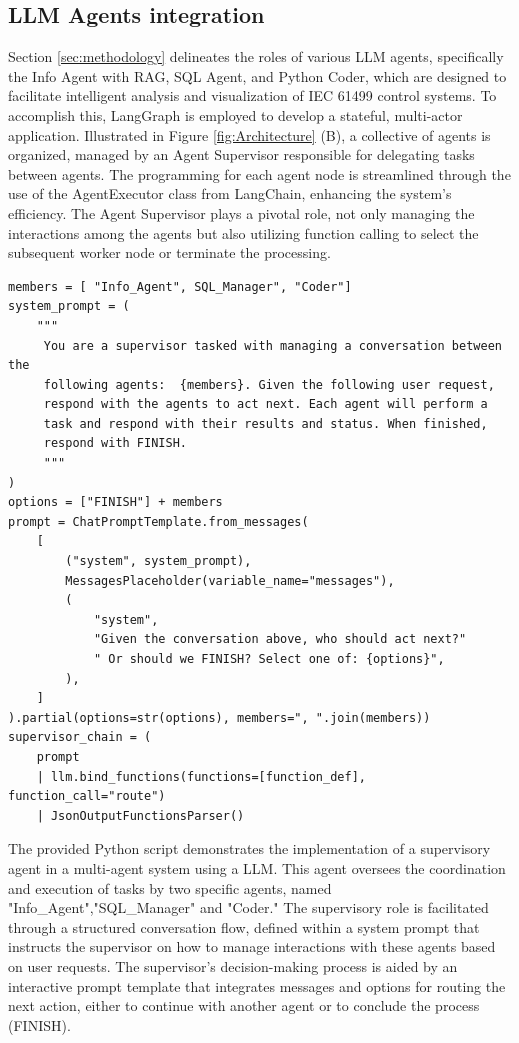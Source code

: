 \documentclass[conference]{IEEEtran}
\begin{document}
\subsection{LLM Agents integration}


Section \ref{sec:methodology} delineates the roles of various LLM agents, specifically the Info Agent with RAG, SQL Agent, and Python Coder, which are designed to facilitate intelligent analysis and visualization of IEC 61499 control systems. To accomplish this, LangGraph is employed to develop a stateful, multi-actor application. Illustrated in Figure \ref{fig:Architecture} (B), a collective of agents is organized, managed by an Agent Supervisor responsible for delegating tasks between agents. The programming for each agent node is streamlined through the use of the AgentExecutor class from LangChain, enhancing the system's efficiency.  The Agent Supervisor plays a pivotal role, not only managing the interactions among the agents but also utilizing function calling to select the subsequent worker node or terminate the processing. 

\begin{lstlisting} 
members = [ "Info_Agent", SQL_Manager", "Coder"]
system_prompt = (
    """
     You are a supervisor tasked with managing a conversation between the
     following agents:  {members}. Given the following user request,
     respond with the agents to act next. Each agent will perform a
     task and respond with their results and status. When finished,
     respond with FINISH.
     """
)
options = ["FINISH"] + members
prompt = ChatPromptTemplate.from_messages(
    [
        ("system", system_prompt),
        MessagesPlaceholder(variable_name="messages"),
        (
            "system",
            "Given the conversation above, who should act next?"
            " Or should we FINISH? Select one of: {options}",
        ),
    ]
).partial(options=str(options), members=", ".join(members))
supervisor_chain = (
    prompt
    | llm.bind_functions(functions=[function_def], function_call="route")
    | JsonOutputFunctionsParser()
\end{lstlisting}

The provided Python script demonstrates the implementation of a supervisory agent in a multi-agent system using a LLM. This agent oversees the coordination and execution of tasks by two specific agents, named "Info\_Agent","SQL\_Manager" and "Coder." The supervisory role is facilitated through a structured conversation flow, defined within a system prompt that instructs the supervisor on how to manage interactions with these agents based on user requests. The supervisor's decision-making process is aided by an interactive prompt template that integrates messages and options for routing the next action, either to continue with another agent or to conclude the process (FINISH).
\end{document}
